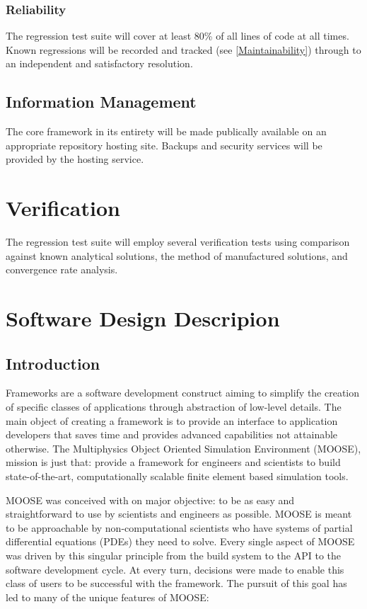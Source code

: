 \documentclass{INLreport}
\begin{document}
\subsubsection{Reliability}
The regression test suite will cover at least 80\% of all lines of code at all times. Known regressions will be recorded
and tracked (see \ref{Maintainability}) through to an independent and satisfactory resolution.

\subsection{Information Management}
The core framework in its entirety will be made publically available on an appropriate repository hosting site. Backups and
security services will be provided by the hosting service.

\section{Verification}

The regression test suite will employ several verification tests using comparison against known analytical solutions, the method of
manufactured solutions, and convergence rate analysis.


\section{Software Design Descripion}

\subsection{Introduction}
Frameworks are a software development construct aiming to simplify the creation of specific classes of applications
through abstraction of low-level details. The main object of creating a framework is to provide an interface to
application developers that saves time and provides advanced capabilities not attainable otherwise. The Multiphysics
Object Oriented Simulation Environment (MOOSE), mission is just that: provide a framework for engineers and scientists
to build state-of-the-art, computationally scalable finite element based simulation tools.

MOOSE was conceived with on major objective: to be as easy and straightforward to use by scientists and engineers as possible.
MOOSE is meant to be approachable by non-computational scientists who have systems of partial differential equations (PDEs) they need to solve. Every single aspect of MOOSE was driven by this singular principle from the build system to the API to the software development cycle.  At every turn, decisions were made to enable this class of users to be successful with the framework.  The pursuit of this goal has led to many of the unique features of MOOSE:
\end{document}
